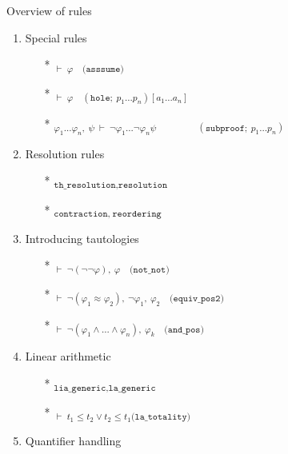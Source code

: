 \documentclass[aspectratio=169,xcolor={dvipsnames}]{beamer}
\begin{document}
\begin{frame}[t]{Overview of rules}
\begin{multicols}{2}
    \begin{enumerate}
        \item Special rules
        \begin{itemize}
            \item[*] \textsubscript{$\vdash~\varphi\quad\texttt{(asssume)}$}
            \item[*] \textsubscript{$\vdash~\varphi\quad(\texttt{hole};~p_1 \dots p_n)[a_1\dots a_n]$}
            \item[*] \textsubscript{$\varphi_1 \dots \varphi_n,~\psi~\vdash~ \neg \varphi_1 \dots \neg \varphi_n \psi$}
                    \textsubscript{$\qquad\qquad (\texttt{subproof};~p_1 \dots p_n)$}
        \end{itemize}
        \item Resolution rules
        \begin{itemize}
            \item[*] \textsubscript{$\texttt{th\_resolution,resolution}$}
            \item[*] \textsubscript{$\texttt{contraction},~\texttt{reordering}$}
        \end{itemize}
        \item Introducing tautologies
        \begin{itemize}
            \item[*] \textsubscript{$\vdash~ \neg (\neg\neg\varphi),~\varphi \quad\texttt{(not\_not)}$}
            \item[*] \textsubscript{$\vdash~ \neg (\varphi_1 \approx \varphi_2),~ \neg \varphi_1,~\varphi_2  \quad\texttt{(equiv\_pos2)}$}
            \item[*] \textsubscript{$\vdash~ \neg (\varphi_1 \land \dots \land \varphi_n),~\varphi_k \quad\texttt{(and\_pos)}$}
        \end{itemize}
        \item Linear arithmetic
        \begin{itemize}
            \item[*] \textsubscript{$\texttt{lia\_generic,la\_generic}$}
            \item[*] \textsubscript{$\vdash~ t_1 \leq t_2 \lor t_2 \leq t_1 \texttt{(la\_totality)}$}
        \end{itemize}
        \item Quantifier handling
        \begin{itemize}

\end{itemize}
\end{enumerate}
\end{multicols}
\end{frame}
\end{document}

